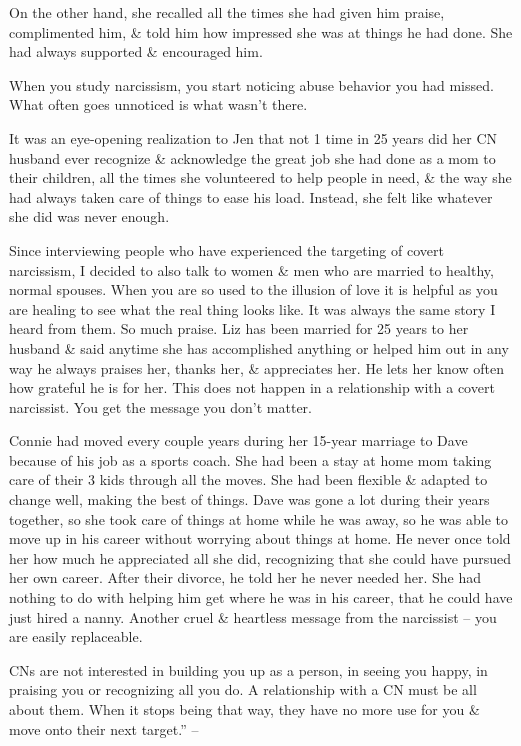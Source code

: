 \documentclass{article}
\numberwithin{equation}{section}
\begin{document}
On the other hand, she recalled all the times she had given him praise, complimented him, \& told him how impressed she was at things he had done. She had always supported \& encouraged him.

When you study narcissism, you start noticing abuse behavior you had missed. What often goes unnoticed is what wasn't there.

It was an eye-opening realization to Jen that not 1 time in 25 years did her CN husband ever recognize \& acknowledge the great job she had done as a mom to their children, all the times she volunteered to help people in need, \& the way she had always taken care of things to ease his load. Instead, she felt like whatever she did was never enough.

Since interviewing people who have experienced the targeting of covert narcissism, I decided to also talk to women \& men who are married to healthy, normal spouses. When you are so used to the illusion of love it is helpful as you are healing to see what the real thing looks like. It was always the same story I heard from them. So much praise. Liz has been married for 25 years to her husband \& said anytime she has accomplished anything or helped him out in any way he always praises her, thanks her, \& appreciates her. He lets her know often how grateful he is for her. This does not happen in a relationship with a covert narcissist. You get the message you don't matter.

Connie had moved every couple years during her 15-year marriage to Dave because of his job as a sports coach. She had been a stay at home mom taking care of their 3 kids through all the moves. She had been flexible \& adapted to change well, making the best of things. Dave was gone a lot during their years together, so she took care of things at home while he was away, so he was able to move up in his career without worrying about things at home. He never once told her how much he appreciated all she did, recognizing that she could have pursued her own career. After their divorce, he told her he never needed her. She had nothing to do with helping him get where he was in his career, that he could have just hired a nanny. Another cruel \& heartless message from the narcissist -- you are easily replaceable.

CNs are not interested in building you up as a person, in seeing you happy, in praising you or recognizing all you do. A relationship with a CN must be all about them. When it stops being that way, they have no more use for you \& move onto their next target.'' -- \cite[pp. 61--62]{Mirza2017}
\end{document}
